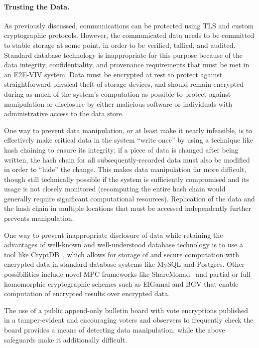 \paragraph{Trusting the Data.} As previously discussed, communications
can be protected using TLS and custom cryptographic protocols.
However, the communicated data needs to be committed to stable storage
at some point, in order to be verified, tallied, and audited. Standard
database technology is inappropriate for this purpose because of the
data integrity, confidentiality, and provenance requirements that must
be met in an E2E-VIV system. Data must be encrypted at rest to protect
against straightforward physical theft of storage devices, and should
remain encrypted during as much of the system's computation as
possible to protect against manipulation or disclosure by either
malicious software or individuals with administrative access to the
data store.

One way to prevent data manipulation, or at least make it nearly
infeasible, is to effectively make critical data in the system ``write
once'' by using a technique like hash chaining to ensure its
integrity; if a piece of data is changed after being written, the hash
chain for all subsequently-recorded data must also be modified in
order to ``hide'' the change. This makes data manipulation far more
difficult, though still technically possible if the system is
sufficiently compromised and its usage is not closely monitored
(recomputing the entire hash chain would generally require significant
computational resources). Replication of the data and the hash chain
in multiple locations that must be accessed independently further
prevents manipulation.

One way to prevent inappropriate disclosure of data while retaining
the advantages of well-known and well-understood database technology
is to use a tool like CryptDB~\cite{Popa11}, which allows for storage
of and secure computation with encrypted data in standard database
systems like MySQL and Postgres. Other possibilities include novel MPC
frameworks like ShareMonad~\cite{Launchbury14} and partial or full
homomorphic cryptographic schemes such as ElGamal and BGV that enable
computation of encrypted results over encrypted data.

The use of a public append-only bulletin board with vote encryptions
published in a tamper-evident and encouraging voters and observers to
frequently check the board provides a means of detecting data
manipulation, while the above safeguards make it additionally
difficult.

